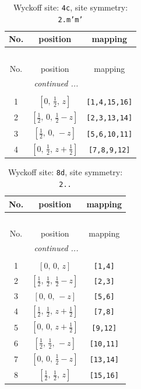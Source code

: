 \documentclass[fleqn,8pt]{jsarticle}
\begin{document}
\renewcommand{\arraystretch}{1.2}
\begin{longtable}{ccc}
\caption{Wyckoff site: {\tt 4c}, site symmetry: {\tt 2.m'm'}}
 \\
 \hline \hline
No. & position & mapping \\ \hline \endfirsthead

\multicolumn{2}{l}{\tablename\ \thetable{}} \\
 \hline \hline
No. & position & mapping \\ \hline \endhead

 \hline \hline
\multicolumn{2}{r}{\footnotesize\it continued ...} \\ \endfoot

 \hline \hline
\multicolumn{2}{r}{} \\ \endlastfoot

1 & $\left[ 0,\, \frac{1}{2},\, z \right]$ & {\tt [1,4,15,16]} \\ \hline
2 & $\left[ \frac{1}{2},\, 0,\, \frac{1}{2} - z \right]$ & {\tt [2,3,13,14]} \\ \hline
3 & $\left[ \frac{1}{2},\, 0,\, - z \right]$ & {\tt [5,6,10,11]} \\ \hline
4 & $\left[ 0,\, \frac{1}{2},\, z + \frac{1}{2} \right]$ & {\tt [7,8,9,12]} \\
\end{longtable}
\renewcommand{\arraystretch}{1.2}
\begin{longtable}{ccc}
\caption{Wyckoff site: {\tt 8d}, site symmetry: {\tt 2..}}
 \\
 \hline \hline
No. & position & mapping \\ \hline \endfirsthead

\multicolumn{2}{l}{\tablename\ \thetable{}} \\
 \hline \hline
No. & position & mapping \\ \hline \endhead

 \hline \hline
\multicolumn{2}{r}{\footnotesize\it continued ...} \\ \endfoot

 \hline \hline
\multicolumn{2}{r}{} \\ \endlastfoot

1 & $\left[ 0,\, 0,\, z \right]$ & {\tt [1,4]} \\ \hline
2 & $\left[ \frac{1}{2},\, \frac{1}{2},\, \frac{1}{2} - z \right]$ & {\tt [2,3]} \\ \hline
3 & $\left[ 0,\, 0,\, - z \right]$ & {\tt [5,6]} \\ \hline
4 & $\left[ \frac{1}{2},\, \frac{1}{2},\, z + \frac{1}{2} \right]$ & {\tt [7,8]} \\ \hline
5 & $\left[ 0,\, 0,\, z + \frac{1}{2} \right]$ & {\tt [9,12]} \\ \hline
6 & $\left[ \frac{1}{2},\, \frac{1}{2},\, - z \right]$ & {\tt [10,11]} \\ \hline
7 & $\left[ 0,\, 0,\, \frac{1}{2} - z \right]$ & {\tt [13,14]} \\ \hline
8 & $\left[ \frac{1}{2},\, \frac{1}{2},\, z \right]$ & {\tt [15,16]} \\
\end{longtable}
\end{document}

